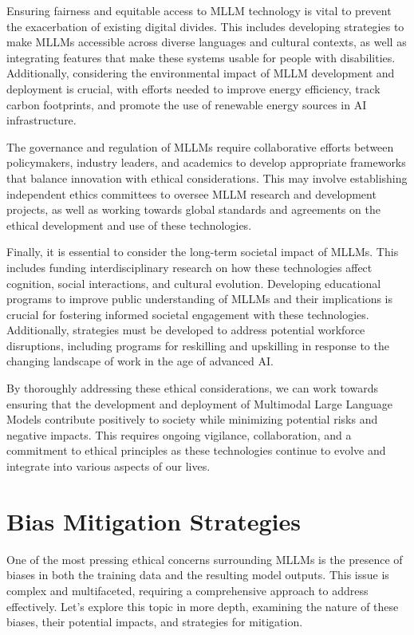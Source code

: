 Ensuring fairness and equitable access to MLLM technology is vital to prevent the exacerbation of existing digital divides\cite{ray2023chatgpt}. This includes developing strategies to make MLLMs accessible across diverse languages and cultural contexts, as well as integrating features that make these systems usable for people with disabilities. Additionally, considering the environmental impact of MLLM development and deployment is crucial, with efforts needed to improve energy efficiency, track carbon footprints, and promote the use of renewable energy sources in AI infrastructure.

The governance and regulation of MLLMs require collaborative efforts between policymakers, industry leaders, and academics to develop appropriate frameworks that balance innovation with ethical considerations. This may involve establishing independent ethics committees to oversee MLLM research and development projects, as well as working towards global standards and agreements on the ethical development and use of these technologies\cite{rosenstrauch2023artificial}.

Finally, it is essential to consider the long-term societal impact of MLLMs. This includes funding interdisciplinary research on how these technologies affect cognition, social interactions, and cultural evolution. Developing educational programs to improve public understanding of MLLMs and their implications is crucial for fostering informed societal engagement with these technologies. Additionally, strategies must be developed to address potential workforce disruptions, including programs for reskilling and upskilling in response to the changing landscape of work in the age of advanced AI.

By thoroughly addressing these ethical considerations, we can work towards ensuring that the development and deployment of Multimodal Large Language Models contribute positively to society while minimizing potential risks and negative impacts. This requires ongoing vigilance, collaboration, and a commitment to ethical principles as these technologies continue to evolve and integrate into various aspects of our lives.

\section{Bias Mitigation Strategies}

One of the most pressing ethical concerns surrounding MLLMs is the presence of biases in both the training data and the resulting model outputs\cite{xu2024survey}. This issue is complex and multifaceted, requiring a comprehensive approach to address effectively. Let's explore this topic in more depth, examining the nature of these biases, their potential impacts, and strategies for mitigation.

